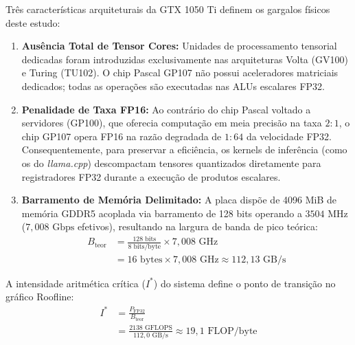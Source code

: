 \documentclass[10pt,a4paper,twocolumn]{article}
\begin{document}
Tr\^es caracter\'isticas arquiteturais da GTX 1050 Ti definem os gargalos f\'isicos deste estudo:
\begin{enumerate}[leftmargin=1.5em,itemsep=0.2em]
    \item \textbf{Aus\^encia Total de Tensor Cores:} Unidades de processamento tensorial dedicadas foram introduzidas exclusivamente nas arquiteturas Volta (GV100) e Turing (TU102). O chip Pascal GP107 n\~ao possui aceleradores matriciais dedicados; todas as opera\c{c}\~oes s\~ao executadas nas ALUs escalares FP32.
    \item \textbf{Penalidade de Taxa FP16:} Ao contr\'ario do chip Pascal voltado a servidores (GP100), que oferecia computa\c{c}\~ao em meia precis\~ao na taxa $2:1$, o chip GP107 opera FP16 na raz\~ao degradada de $1:64$ da velocidade FP32. Consequentemente, para preservar a efici\^encia, os kernels de infer\^encia (como os do \emph{llama.cpp}) descompactam tensores quantizados diretamente para registradores FP32 durante a execu\c{c}\~ao de produtos escalares.
    \item \textbf{Barramento de Mem\'oria Delimitado:} A placa disp\~oe de 4096 MiB de mem\'oria GDDR5 acoplada via barramento de 128 bits operando a $3504\text{ MHz}$ ($7,008\text{ Gbps}$ efetivos), resultando na largura de banda de pico te\'orica:
    \begin{equation}
    \begin{aligned}
    B_{\text{teor}} &= \frac{128\text{ bits}}{8\text{ bits/byte}} \times 7,008\text{ GHz}\\
    &= 16\text{ bytes} \times 7,008\text{ GHz} \approx 112,13\text{ GB/s}
    \end{aligned}
    \end{equation}
\end{enumerate}

A intensidade aritm\'etica cr\'itica ($I^*$) do sistema define o ponto de transi\c{c}\~ao no gr\'afico Roofline:
\begin{equation}
 \begin{aligned}
 I^* &= \frac{P_{\text{FP32}}}{B_{\text{teor}}}\\
 &= \frac{2138\text{ GFLOPS}}{112,0\text{ GB/s}} \approx 19,1\text{ FLOP/byte}
 \end{aligned}
\end{equation}
\end{document}
